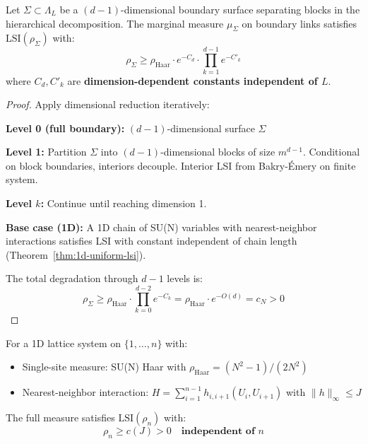 \begin{theorem}
\label{thm:boundary-dim-reduction}
Let $\Sigma \subset \Lambda_L$ be a $(d-1)$-dimensional boundary surface separating 
blocks in the hierarchical decomposition. The marginal measure $\mu_\Sigma$ on 
boundary links satisfies $\mathrm{LSI}(\rho_\Sigma)$ with:
\[
\rho_\Sigma \geq \rho_{\mathrm{Haar}} \cdot e^{-C_d} \cdot \prod_{k=1}^{d-1} e^{-C'_k}
\]
where $C_d, C'_k$ are \textbf{dimension-dependent constants independent of $L$}.
\end{theorem}

\begin{proof}
Apply dimensional reduction iteratively:

\textbf{Level 0 (full boundary):} $(d-1)$-dimensional surface $\Sigma$

\textbf{Level 1:} Partition $\Sigma$ into $(d-1)$-dimensional blocks of size $m^{d-1}$.
Conditional on block boundaries, interiors decouple. Interior LSI from Bakry-Émery 
on finite system.

\textbf{Level $k$:} Continue until reaching dimension 1.

\textbf{Base case (1D):} A 1D chain of SU(N) variables with nearest-neighbor 
interactions satisfies LSI with constant independent of chain length 
(Theorem~\ref{thm:1d-uniform-lsi}).

The total degradation through $d-1$ levels is:
\[
\rho_\Sigma \geq \rho_{\mathrm{Haar}} \cdot \prod_{k=0}^{d-2} e^{-C_k} = \rho_{\mathrm{Haar}} \cdot e^{-O(d)} = c_N > 0
\]
\end{proof}

\begin{theorem}
\label{thm:1d-uniform-lsi-app83}
For a 1D lattice system on $\{1, \ldots, n\}$ with:
\begin{itemize}
\item Single-site measure: SU(N) Haar with $\rho_{\mathrm{Haar}} = (N^2-1)/(2N^2)$
\item Nearest-neighbor interaction: $H = \sum_{i=1}^{n-1} h_{i,i+1}(U_i, U_{i+1})$ with $\|h\|_\infty \leq J$
\end{itemize}
The full measure satisfies $\mathrm{LSI}(\rho_n)$ with:
\[
\rho_n \geq c(J) > 0 \quad \textbf{independent of } n
\]
\end{theorem}

